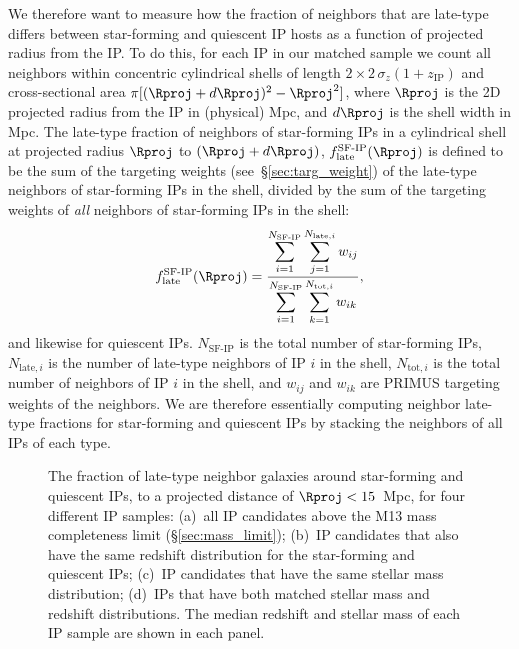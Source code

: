 We therefore want to measure how the fraction of neighbors that are late-type differs 
between star-forming and quiescent IP hosts as a function of projected radius from 
the IP.
To do this, for each IP in our matched sample we count all neighbors within 
concentric cylindrical shells of length {$2\times2\,\sigma_{z}(1+z_{\text{IP}})$} 
and cross-sectional area
${\pi[(\Rproj+d\Rproj)^2-\Rproj^2]}$, where $\Rproj$ is the 2D projected radius from the IP in (physical) Mpc, and $d\Rproj$ is the shell width in Mpc.
The late-type fraction of neighbors of star-forming IPs in a cylindrical shell 
at projected radius $\Rproj$ to ${(\Rproj+d\Rproj)}$, $f^{\textrm{SF-IP}}_{\textrm{late}}
(\Rproj)$ is defined to be the sum of the targeting weights (see~\S\ref{sec:targ_weight}) of the late-type neighbors of star-forming IPs in the shell, 
divided by the sum of the
targeting weights of \emph{all} neighbors of star-forming IPs in the shell:
\begin{equation}
        f^{\textrm{SF-IP}}_{\textrm{late}}(\Rproj) = \frac
        {\displaystyle \sum_{i=1}^{N_{\textrm{SF-IP}}} \sum_{j=1}^{N_{\textrm{late},i}} w_{ij} }
        {\displaystyle \sum_{i=1}^{N_{\textrm{SF-IP}}} \sum_{k=1}^{N_{\textrm{tot},i}} w_{ik} }, \nonumber
\end{equation}
and likewise for quiescent IPs.
$N_{\textrm{SF-IP}}$ is the total number of star-forming IPs, $N_{\textrm{late},i}$ is the number of late-type neighbors of IP $i$ in the shell, $N_{\textrm{tot},i}$ is the
total number of neighbors of IP $i$ in the shell, and $w_{ij}$ and $w_{ik}$ are PRIMUS targeting weights of the neighbors.
We are therefore essentially computing neighbor late-type fractions for star-forming 
and quiescent IPs by stacking the neighbors of all IPs of each type.

\begin{figure*}
  \epstrim{0.1in 0.3in 0.4in 0.8in}
  \caption{
The fraction of late-type neighbor galaxies around star-forming 
and quiescent IPs, to a projected distance of {$\Rproj<15$}~Mpc, 
 for four different IP samples: 
(a)~all IP candidates above the M13 mass completeness limit (\S\ref{sec:mass_limit});
(b)~IP candidates that also have the same redshift distribution for the star-forming
and quiescent IPs; 
(c)~IP candidates that have the same stellar mass distribution;
(d)~IPs that have both matched stellar mass and redshift distributions.
The median redshift and stellar mass of each IP sample are shown in each panel.
}
  \label{fig:IPsample_compare}
\end{figure*}


